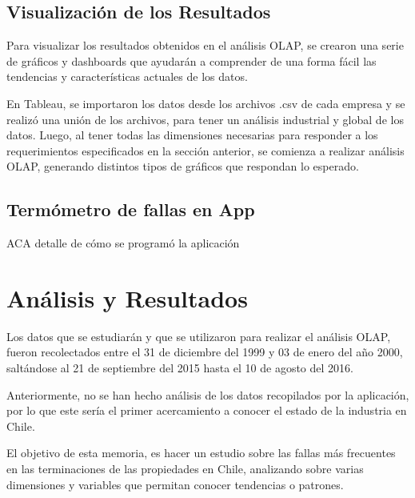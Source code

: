 \documentclass[letter,12pt,oneside]{report}
\begin{document}
\section{Visualización de los Resultados}
Para visualizar los resultados obtenidos en el análisis OLAP, se crearon una serie de gráficos y dashboards que ayudarán a comprender de una forma fácil las tendencias y características actuales de los datos.

En Tableau, se importaron los datos desde los archivos .csv de cada empresa y se realizó una unión de los archivos, para tener un análisis industrial y global de los datos. Luego, al tener todas las dimensiones necesarias para responder a los requerimientos especificados en la sección anterior, se comienza a realizar análisis OLAP, generando distintos tipos de gráficos que respondan lo esperado.

\section{Termómetro de fallas en App}
ACA detalle de cómo se programó la aplicación

\newpage
\chapter{Análisis y Resultados}
Los datos que se estudiarán y que se utilizaron para realizar el análisis OLAP, fueron recolectados entre el 31 de diciembre del 1999 y 03 de enero del año 2000, saltándose al 21 de septiembre del 2015 hasta el 10 de agosto del 2016.

Anteriormente, no se han hecho análisis de los datos recopilados por la aplicación, por lo que este sería el primer acercamiento a conocer el estado de la industria en Chile.

El objetivo de esta memoria, es hacer un estudio sobre las fallas más frecuentes en las terminaciones de las propiedades en Chile, analizando sobre varias dimensiones y variables que permitan conocer tendencias o patrones. 
\end{document}
